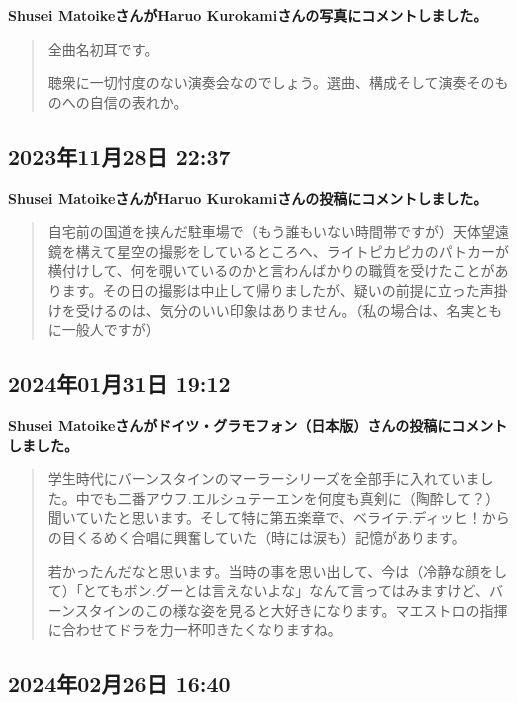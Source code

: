 \textbf{Shusei MatoikeさんがHaruo Kurokamiさんの写真にコメントしました。}

\begin{quote}
全曲名初耳です。

聴衆に一切忖度のない演奏会なのでしょう。選曲、構成そして演奏そのものへの自信の表れか。
\end{quote}

\subsection*{2023年11月28日 22:37}

\textbf{Shusei MatoikeさんがHaruo Kurokamiさんの投稿にコメントしました。}

\begin{quote}
自宅前の国道を挟んだ駐車場で（もう誰もいない時間帯ですが）天体望遠鏡を構えて星空の撮影をしているところへ、ライトピカピカのパトカーが横付けして、何を覗いているのかと言わんばかりの職質を受けたことがあります。その日の撮影は中止して帰りましたが、疑いの前提に立った声掛けを受けるのは、気分のいい印象はありません。（私の場合は、名実ともに一般人ですが）
\end{quote}

\subsection*{2024年01月31日 19:12}

\textbf{Shusei Matoikeさんがドイツ・グラモフォン（日本版）さんの投稿にコメントしました。}

\begin{quote}
学生時代にバーンスタインのマーラーシリーズを全部手に入れていました。中でも二番アウフ.エルシュテーエンを何度も真剣に（陶酔して？）聞いていたと思います。そして特に第五楽章で、ベライテ.ディッヒ！からの目くるめく合唱に興奮していた（時には涙も）記憶があります。

若かったんだなと思います。当時の事を思い出して、今は（冷静な顔をして）「とてもボン.グーとは言えないよな」なんて言ってはみますけど、バーンスタインのこの様な姿を見ると大好きになります。マエストロの指揮に合わせてドラを力一杯叩きたくなりますね。
\end{quote}

\subsection*{2024年02月26日 16:40}

